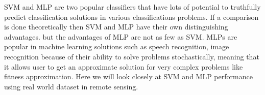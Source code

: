 SVM and MLP are two popular classifiers that have lots of potential to truthfully predict classification solutions in various classifications problems\cite{Moavenian20103088,Zanaty2012177}. 
If a comparison is done theoretically then SVM and MLP have their own distinguishing advantages. 
but the advantages of MLP are not as few as SVM. 
MLPs are popular in machine learning solutions such as speech recognition, image recognition because of their ability to solve problems stochastically, meaning that it allows user to get an approximate solution for very complex problems like fitness approximation\cite{jin2005neural}. 
Here we will look closely at SVM and MLP performance using real world dataset in remote sensing.\\

